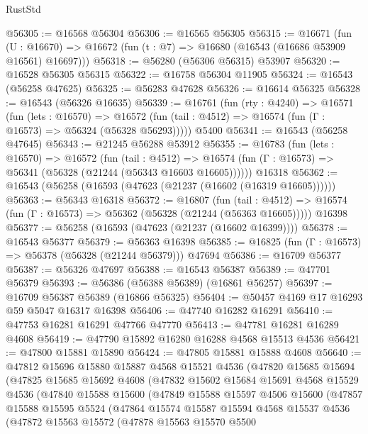 \begin{lexlean}{RustStd}
\begin{coremodule}
@56305 := @16568 @56304
@56306 := @16565 @56305
@56315 := @16671
    (fun (U : @16670) => @16672 (fun (t : @7) => @16680 (@16543 (@16686 @53909 @16561) @16697)))
@56318 := @56280 (@56306 @56315) @53907
@56320 := @16528 @56305 @56315
@56322 := @16758 @56304 @11905
@56324 := @16543 (@56258 @47625)
@56325 := @56283 @47628
@56326 := @16614 @56325
@56328 := @16543 (@56326 @16635)
@56339 := @16761
    (fun (rty : @4240) =>
    @16571
      (fun (lets : @16570) =>
      @16572 (fun (tail : @4512) => @16574 (fun (Γ : @16573) => @56324 (@56328 @56293)))))
    @5400
@56341 := @16543 (@56258 @47645)
@56343 := @21245 @56288 @53912
@56355 := @16783
    (fun (lets : @16570) =>
    @16572
      (fun (tail : @4512) =>
      @16574 (fun (Γ : @16573) => @56341 (@56328 (@21244 (@56343 @16603 @16605))))))
    @16318
@56362 := @16543 (@56258 (@16593 (@47623 (@21237 (@16602 (@16319 @16605))))))
@56363 := @56343 @16318
@56372 := @16807
    (fun (tail : @4512) => @16574 (fun (Γ : @16573) => @56362 (@56328 (@21244 (@56363 @16605)))))
    @16398
@56377 := @56258 (@16593 (@47623 (@21237 (@16602 @16399))))
@56378 := @16543 @56377
@56379 := @56363 @16398
@56385 := @16825 (fun (Γ : @16573) => @56378 (@56328 (@21244 @56379))) @47694
@56386 := @16709 @56377
@56387 := @56326 @47697
@56388 := @16543 @56387
@56389 := @47701 @56379
@56393 := @56386 (@56388 @56389) (@16861 @56257)
@56397 := @16709 @56387 @56389 (@16866 @56325)
@56404 := @50457 @4169 @17 @16293 @59 @5047 @16317 @16398
@56406 := @47740 @16282 @16291
@56410 := @47753 @16281 @16291 @47766 @47770
@56413 := @47781 @16281 @16289 @4608
@56419 := @47790 @15892 @16280 @16288 @4568 @15513 @4536
@56421 := @47800 @15881 @15890
@56424 := @47805 @15881 @15888 @4608
@56640 := @47812
    @15696
    @15880
    @15887
    @4568
    @15521
    @4536
    (@47820
      @15685
      @15694
      (@47825
        @15685
        @15692
        @4608
        (@47832
          @15602
          @15684
          @15691
          @4568
          @15529
          @4536
          (@47840
            @15588
            @15600
            (@47849
              @15588
              @15597
              @4506
              @15600
              (@47857
                @15588
                @15595
                @5524
                (@47864
                  @15574
                  @15587
                  @15594
                  @4568
                  @15537
                  @4536
                  (@47872
                    @15563
                    @15572
                    (@47878
                      @15563
                      @15570
                      @5500

\end{coremodule}
\end{lexlean}
